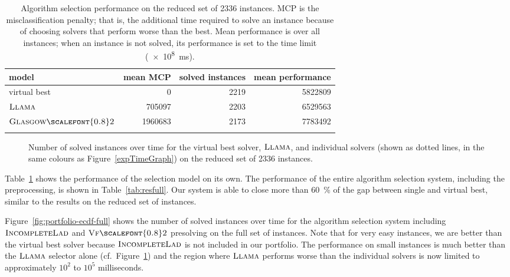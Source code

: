 \documentclass{llncs}
\newcommand{\VFtwo}{$\textsc{Vf{\scalefont{0.8}2}}$\xspace}
\newcommand{\IncompleteLAD}{$\textsc{IncompleteLad}$\xspace}
\newcommand{\GlasgowTwo}{$\textsc{Glasgow{\scalefont{0.8}2}}$\xspace}
\newcommand{\LLAMA}{$\textsc{Llama}$\xspace}
\begin{document}
\begin{table}[p]
    \centering\setlength{\tabcolsep}{1em}
\begin{tabular}{lrrr}
  \toprule
model & mean MCP & solved instances & mean performance\\
  \midrule
virtual best & 0 & 2219 & 5822809\\
\LLAMA & 705097 & 2203 & 6529563\\
\GlasgowTwo & 1960683 & 2173 & 7783492\\
   \bottomrule \\
\end{tabular}
\caption{Algorithm selection performance on the reduced set of 2336 instances. MCP is the
misclassification penalty; that is, the additional time required to solve an instance because of
choosing solvers that perform worse than the best. Mean performance is over all instances; when an
instance is not solved, its performance is set to the time limit
(\SI{e8}{\ms}).}\label{tab:res}
\end{table}

\begin{figure}[p]


\caption{Number of solved instances over time for the virtual best
solver, \LLAMA, and individual solvers (shown as dotted lines, in the same
colours as Figure~\ref{expTimeGraph}) on the reduced set of 2336 instances.}
\label{fig:portfolio-ecdf}
\end{figure}

Table~\ref{tab:res} shows the performance of the selection model on its own. The performance of the
entire algorithm selection system, including the preprocessing, is shown in Table~\ref{tab:resfull}.
Our system is able to close more than \SI{60}{\percent} of the gap between
single and virtual best, similar to the results on the reduced set of instances.

Figure~\ref{fig:portfolio-ecdf-full} shows the number of solved instances over time for the
algorithm selection system including \IncompleteLAD and \VFtwo presolving on the full set of
instances. Note that for very easy instances, we are better than the virtual best solver because
\IncompleteLAD is not included in our portfolio. The performance on small instances is much better
than the \LLAMA selector alone (cf.\ Figure~\ref{fig:portfolio-ecdf}) and the region where \LLAMA
performs worse than the individual solvers is now limited to approximately $10^2$ to $10^5$
milliseconds.
\end{document}
